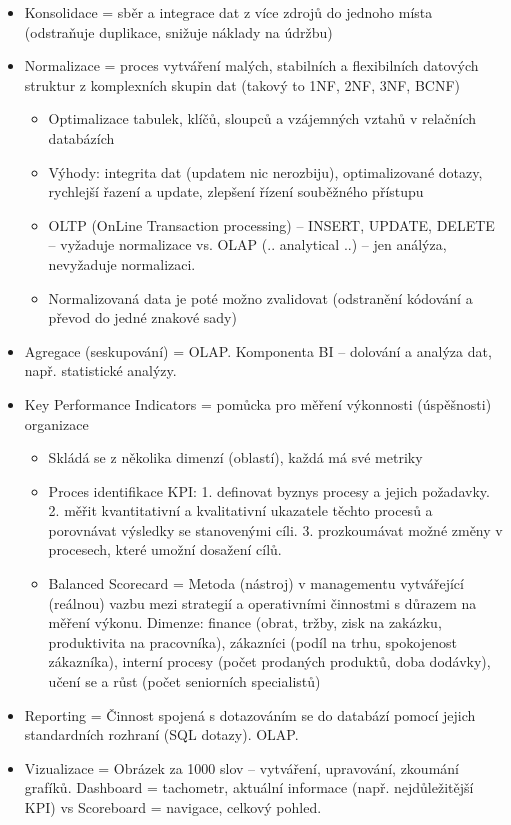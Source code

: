 \documentclass[a4paper,hidelinks]{article}
\begin{document}
\begin{itemize}
    \item Konsolidace = sběr a integrace dat z více zdrojů do jednoho místa (odstraňuje duplikace, snižuje náklady na údržbu)
    \item Normalizace = proces vytváření malých, stabilních a flexibilních datových struktur z komplexních skupin dat (takový to 1NF, 2NF, 3NF, BCNF)
    \begin{itemize}
        \item Optimalizace tabulek, klíčů, sloupců a vzájemných vztahů v relačních databázích
        \item Výhody: integrita dat (updatem nic nerozbiju), optimalizované dotazy, rychlejší řazení a update, zlepšení řízení souběžného přístupu
        \item OLTP (OnLine Transaction processing) -- INSERT, UPDATE, DELETE -- vyžaduje normalizace vs. OLAP (.. analytical ..) -- jen análýza, nevyžaduje normalizaci.
        \item Normalizovaná data je poté možno zvalidovat (odstranění kódování a převod do jedné znakové sady)
    \end{itemize}
    \item Agregace (seskupování) = OLAP. Komponenta BI -- dolování a analýza dat, např. statistické analýzy.
    \item Key Performance Indicators = pomůcka pro měření výkonnosti (úspěšnosti) organizace
    \begin{itemize}
        \item Skládá se z několika dimenzí (oblastí), každá má své metriky
        \item Proces identifikace KPI: 1. definovat byznys procesy a jejich požadavky. 2. měřit kvantitativní a kvalitativní ukazatele těchto procesů a porovnávat výsledky se stanovenými cíli. 3. prozkoumávat možné změny v procesech, které umožní dosažení cílů.
        \item Balanced Scorecard = Metoda (nástroj) v managementu vytvářející (reálnou) vazbu mezi strategií a operativními činnostmi s důrazem na měření výkonu. Dimenze: finance (obrat, tržby, zisk na zakázku, produktivita na pracovníka), zákazníci (podíl na trhu, spokojenost zákazníka), interní procesy (počet prodaných produktů, doba dodávky), učení se a růst (počet seniorních specialistů)
    \end{itemize}
    \item Reporting = Činnost spojená s dotazováním se do databází pomocí jejich standardních rozhraní (SQL dotazy). OLAP.
    \item Vizualizace = Obrázek za 1000 slov -- vytváření, upravování, zkoumání grafíků. Dashboard = tachometr, aktuální informace (např. nejdůležitější KPI) vs Scoreboard = navigace, celkový pohled.
\end{itemize}
\end{document}
